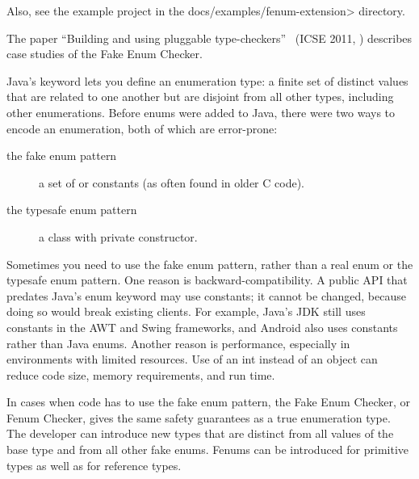 Also, see the example project in the \<docs/examples/fenum-extension> directory.

The paper ``Building and using pluggable
type-checkers''~\cite{DietlDEMS2011} (ICSE 2011,
)
describes case studies of the Fake Enum Checker.



Java's
\href{https://docs.oracle.com/javase/specs/jls/se11/html/jls-8.html#jls-8.9}{}
keyword lets you define an enumeration type: a finite set of distinct values
that are related to one another but are disjoint from all other
types, including other enumerations.
Before enums were added to Java, there were two ways to encode an
enumeration, both of which are error-prone:

\begin{description}
\item[the fake enum pattern]  a set of  or 
  constants (as often found in older C code).

\item[the typesafe enum pattern]  a class with private constructor.
\end{description}

Sometimes you need to use the fake enum pattern,
rather than a real enum or the typesafe enum pattern.
%
One reason is backward-compatibility.  A public API that predates Java's
enum keyword may use  constants; it cannot be changed, because
doing so would break existing clients.  For example, Java's JDK still uses
 constants in the AWT and Swing frameworks, and Android also uses
 constants rather than Java enums.
%
Another reason is performance, especially in environments with limited
resources.  Use of an int instead of an object can
reduce code size, memory requirements, and run time.

In cases when code has to use the fake enum pattern, the Fake Enum Checker,
or Fenum Checker, gives the same safety guarantees as a true enumeration type.
The developer can introduce new types that are distinct from all values of the
base type and from all other fake enums. Fenums can be introduced for
primitive types as well as for reference types.


